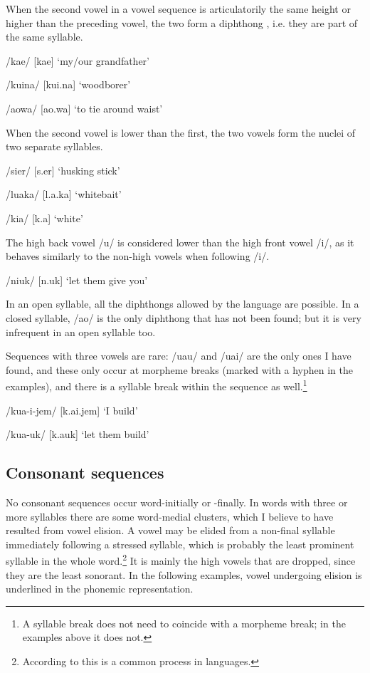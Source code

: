 When the second vowel in a vowel sequence is articulatorily the same height or higher than the preceding vowel, the two form a diphthong , i.e. they are part of the same syllable.

/kae/  [{{\textprimstress}kae}]  `my/our grandfather'

/kuina/  [{{\textprimstress}kui.na}]  `woodborer'

/aowa/  [{{\textprimstress}ao.wa}]  `to tie around waist'

When the second vowel is lower than the first, the two vowels form the nuclei of two separate syllables. 

/sier/  [s{\textsci}.{{\textprimstress}er}]  `husking stick'

/luaka/  [l{\textupsilon}.{{\textprimstress}a.ka}]  `whitebait'

/kia/  [k{\textsci}.{{\textprimstress}a}]  `white'

The high back vowel /u/ is considered lower than the high front vowel /i/, as it behaves similarly to the non-high vowels when following /i/.

/niuk/  [n{\textsci}.{{\textprimstress}uk}]  `let them give you'

In an open syllable, all the diphthongs allowed by the language are possible. In a closed syllable, /ao/ is the only diphthong that has not been found; but it is very infrequent in an open syllable too. 

Sequences with three vowels are rare: /uau/ and /uai/ are the only ones I have found, and these only occur at morpheme breaks (marked with a hyphen in the examples), and there is a syllable break within the sequence as well.\footnote{A syllable break does not need to coincide with a morpheme break; in the examples above it does not.}  

/kua-i-jem/    [k{\textupsilon}.{{\textprimstress}}ai.jem]      `I build'

/kua-uk/      [k{\textupsilon}.{{\textprimstress}a}uk]      `let them build'

\subsection{Consonant sequences} \label{sec:2.2.3:consseq}

No consonant sequences occur word-initially or -finally. In words with three or more syllables there are some word-medial clusters, which I believe to have resulted from vowel elision.  A vowel may be elided from a non-final syllable immediately following a stressed syllable, which is probably the least prominent syllable in the whole word.\footnote{According to \citet[11]{Sommerstein1977} this is a common process in languages.} It is mainly the high vowels that are dropped, since they are the least sonorant. In the following examples, vowel undergoing elision is underlined in the phonemic representation.

